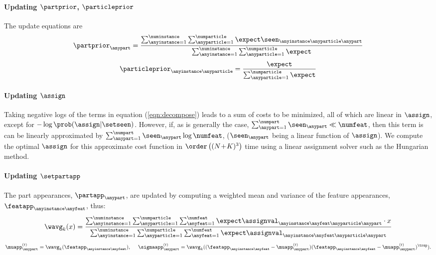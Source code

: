 \paragraph{Updating $\partprior$, $\particleprior$}  The update equations are
\begin{equation}
\partprior_{\anypart} = \frac{\sum_{\anyinstance=1}^\numinstance \sum_{\anyparticle = 1}^{\numparticle} \expect\seen_{\anyinstance\anyparticle\anypart}}{\sum_{\anyinstance=1}^\numinstance \sum_{\anyparticle = 1}^{\numparticle} \expect} 
\end{equation}
\begin{equation}
\particleprior_{\anyinstance\anyparticle} = 
\frac{\expect}{\sum_{\anyparticle = 1}^{\numparticle} \expect}
\end{equation}

\paragraph{Updating $\assign$}
Taking negative logs of the terms in equation (\ref{eqn:decompose}) leads to a sum of costs to be minimized, all of which are linear in $\assign$, except for $-\log\prob(\assign|\setseen)$. However, if, as is generally the case, $\sum_{\anypart=1}^{\numpart}\seen_\anypart \ll \numfeat$, then this term is can be linearly approximated by $\sum_{\anypart=1}^{\numpart}\seen_\anypart\log\numfeat$, ($\seen_\anypart$ being a linear function of $\assign$). We compute the optimal $\assign$ for this approximate cost function in $\order\left((N\!+\!K)^3\right)$ time using a linear assignment solver such as the Hungarian method.

\paragraph{Updating $\setpartapp$}
The part appearances, $\partapp_\anypart$, are updated by computing a weighted mean and variance of the feature appearances, $\featapp_{\anyinstance\anyfeat}$, thus:
\begin{equation}
\wavg_k(x) = \frac{\sum_{\anyinstance=1}^\numinstance \sum_{\anyparticle = 1}^{\numparticle} \sum_{\anyfeat=1}^{\numfeat}\expect\assignval_{\anyinstance\anyfeat\anyparticle\anypart} \cdot x}{\sum_{\anyinstance=1}^\numinstance \sum_{\anyparticle = 1}^{\numparticle} \sum_{\anyfeat=1}^{\numfeat}\expect\assignval_{\anyinstance\anyfeat\anyparticle\anypart}}
\label{eq:weightedavg}
\end{equation}\vspace{-2mm}
\begin{equation}
\muapp_{\anypart}^{(t)} = \wavg_k(\featapp_{\anyinstance\anyfeat}), ~~~~ 
\sigmaapp_{\anypart}^{(t)} = \wavg_k((\featapp_{\anyinstance\anyfeat} - \muapp_{\anypart}^{(t)})(\featapp_{\anyinstance\anyfeat} - \muapp_{\anypart}^{(t)})^\trsp).
\label{eq:updatepartapp}
\end{equation}

